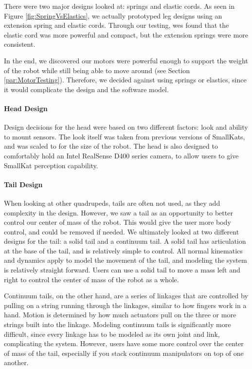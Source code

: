                 There were two major designs looked at: springs and elastic cords. As seen in Figure \ref{fig:SpringVsElastics}, we actually prototyped leg designs using an extension spring and elastic cords. Through our testing, wes found that the elastic cord was more powerful and compact, but the extension springs were more consistent.

                In the end, we discovered our motors were powerful enough to support the weight of the robot while still being able to move around (see Section \ref{par:MotorTesting}). Therefore, we decided against using springs or elastics, since it would complicate the design and the software model.

            \paragraph{Head Design}
                Design decisions for the head were based on two different factors: look and ability to mount sensors. The look itself was taken from previous versions of SmallKats, and was scaled to for the size of the robot. The head is also designed to comfortably hold an Intel RealSense D400 series camera, to allow users to give SmallKat perception capability.

            \paragraph{Tail Design}
                When looking at other quadrupeds, tails are often not used, as they add complexity in the design. However, we saw a tail as an opportunity to better control our center of mass of the robot. This would give the user more body control, and could be removed if needed. We ultimately looked at two different designs for the tail: a solid tail and a continuum tail. A solid tail has articulation at the base of the tail, and is relatively simple to control. All normal kinematics and dynamics apply to model the movement of the tail, and modeling the system is relatively straight forward. Users can use a solid tail to move a mass left and right to control the center of mass of the robot as a whole.

                Continuum tails, on the other hand, are a series of linkages that are controlled by pulling on a string running through the linkages, similar to how fingers work in a hand. Motion is determined by how much actuators pull on the three or more strings built into the linkage. Modeling continuum tails is significantly more difficult, since every linkage has to be modeled as its own joint and link, complicating the system. However, users have some more control over the center of mass of the tail, especially if you stack continuum manipulators on top of one another.

